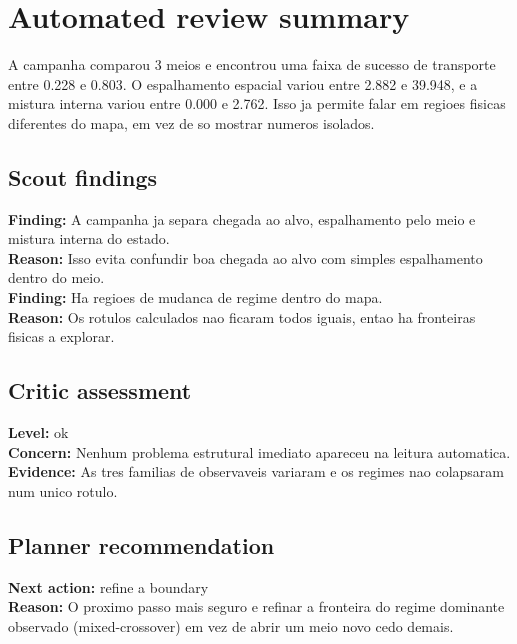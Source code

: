 \section{Automated review summary}
A campanha comparou 3 meios e encontrou uma faixa de sucesso de transporte entre 0.228 e 0.803. O espalhamento espacial variou entre 2.882 e 39.948, e a mistura interna variou entre 0.000 e 2.762. Isso ja permite falar em regioes fisicas diferentes do mapa, em vez de so mostrar numeros isolados.

\subsection{Scout findings}
\textbf{Finding:} A campanha ja separa chegada ao alvo, espalhamento pelo meio e mistura interna do estado.\\
\textbf{Reason:} Isso evita confundir boa chegada ao alvo com simples espalhamento dentro do meio.\\

\textbf{Finding:} Ha regioes de mudanca de regime dentro do mapa.\\
\textbf{Reason:} Os rotulos calculados nao ficaram todos iguais, entao ha fronteiras fisicas a explorar.\\

\subsection{Critic assessment}
\textbf{Level:} ok\\
\textbf{Concern:} Nenhum problema estrutural imediato apareceu na leitura automatica.\\
\textbf{Evidence:} As tres familias de observaveis variaram e os regimes nao colapsaram num unico rotulo.\\

\subsection{Planner recommendation}
\textbf{Next action:} refine a boundary\\
\textbf{Reason:} O proximo passo mais seguro e refinar a fronteira do regime dominante observado (mixed-crossover) em vez de abrir um meio novo cedo demais.\\
